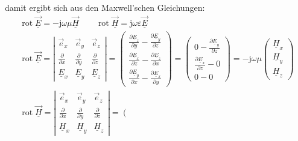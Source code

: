 damit ergibt sich aus den Maxwell'schen Gleichungen:
{\footnotesize
$$
	\begin{gathered}
		\boxed{\operatorname{rot} \underline{\vec{E}}=-\mathrm{j} \omega \mu \underline{\vec{H}}} \qquad \boxed{\operatorname{rot} \underline{\vec{H}}=\mathrm{j} \omega \varepsilon \underline{\vec{E}}} \\
		\operatorname{rot} \underline{\vec{E}}=\left|\begin{array}{ccc}
			\vec{e}_x                   & \vec{e}_y                   & \vec{e}_z                   \\
			\frac{\partial}{\partial x} & \frac{\partial}{\partial y} & \frac{\partial}{\partial z} \\
			\underline{E}_x             & \underline{E}_y             & \underline{E}_z
		\end{array}\right|=\left(\begin{array}{c}
				\frac{\partial \underline{E}_z}{\partial y}-\frac{\partial \underline{E}_y}{\partial z} \\
				\frac{\partial \underline{E}_x}{\partial z}-\frac{\partial \underline{E}_z}{\partial x} \\
				\frac{\partial \underline{E}_y}{\partial x}-\frac{\partial \underline{E}_x}{\partial y}
			\end{array}\right)=\left(\begin{array}{l}
				0-\frac{\partial \underline{E}_y}{\partial z} \\
				\frac{\partial \underline{E}_x}{\partial z}-0 \\
				0-0
			\end{array}\right)=-\mathrm{j} \omega \mu\left(\begin{array}{l}
				\underline{H}_x \\
				\underline{H}_y \\
				\underline{H}_z
			\end{array}\right) \\
		\operatorname{rot} \underline{\vec{H}}=\left|\begin{array}{ccc}
			\vec{e}_x                   & \vec{e}_y                   & \vec{e}_z                   \\
			\frac{\partial}{\partial x} & \frac{\partial}{\partial y} & \frac{\partial}{\partial z} \\
			\underline{H}_x             & \underline{H}_y             & \underline{H}_z
		\end{array}\right|=\left(\begin{array}{c}

\end{array}
\end{gathered}$$}
